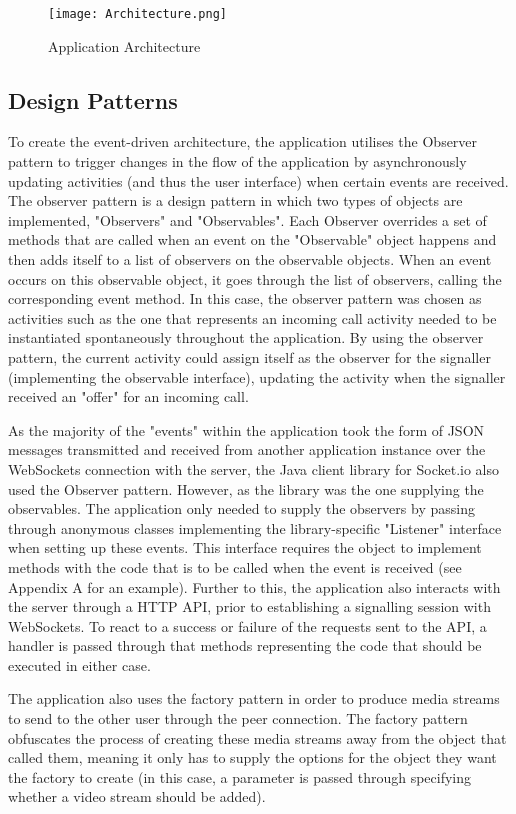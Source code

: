 \documentclass[]{report}
\begin{document}
			\begin{figure}[H]
			\caption{Application Architecture}
			\texttt{[image: Architecture.png]}
			\end{figure}	
					
			\subsection{Design Patterns}
			To create the event-driven architecture, the application utilises the Observer pattern to trigger changes in the flow of the application by asynchronously updating activities (and thus the user interface) when certain events are received. The observer pattern is a design pattern in which two types of objects are implemented, "Observers" and "Observables". Each Observer overrides a set of methods that are called when an event on the "Observable" object happens and then adds itself to a list of observers on the observable objects. When an event occurs on this observable object, it goes through the list of observers, calling the corresponding event method. In this case, the observer pattern was chosen as activities such as the one that represents an incoming call activity needed to be instantiated spontaneously throughout the application. By using the observer pattern, the current activity could assign itself as the observer for the signaller (implementing the observable interface), updating the activity when the signaller received an "offer" for an incoming call.
			
			As the majority of the "events" within the application took the form of JSON messages transmitted and received from another application instance over the WebSockets connection with the server, the Java client library for Socket.io also used the Observer pattern. However, as the library was the one supplying the observables. The application only needed to supply the observers by passing through anonymous classes implementing the library-specific "Listener" interface when setting up these events. This interface requires the object to implement methods with the code that is to be called when the event is received (see Appendix A for an example). Further to this, the application also interacts with the server through a HTTP API, prior to establishing a signalling session with WebSockets. To react to  a success or failure of the requests sent to the API, a handler is passed through that methods representing the code that should be executed in either case.
			
			The application also uses the factory pattern in order to produce media streams to send to the other user through the peer connection. The factory pattern obfuscates the process of creating these media streams away from the object that called them, meaning it only has to supply the options for the object they want the factory to create (in this case, a parameter is passed through specifying whether a video stream should be added).
			
\end{document}
